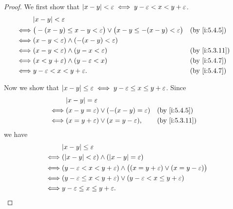 \begin{proof}
  We first show that \(\left\lvert x - y\right\rvert < \varepsilon \iff y - \varepsilon < x < y + \varepsilon\).
  \begin{align*}
         & \abs{x - y} < \varepsilon                                                                                       \\
    \iff & \big(-(x - y) \leq x - y < \varepsilon\big) \lor \big(x - y \leq -(x - y) < \varepsilon\big) &  & \by{i:5.4.5}  \\
    \iff & (x - y < \varepsilon) \land (-(x - y) < \varepsilon)                                                            \\
    \iff & (x - y < \varepsilon) \land (y - x < \varepsilon)                                            &  & \by{i:5.3.11} \\
    \iff & (x < y + \varepsilon) \land (y - \varepsilon < x)                                            &  & \by{i:5.4.7}  \\
    \iff & y - \varepsilon < x < y + \varepsilon.                                                       &  & \by{i:5.4.7}
  \end{align*}

  Now we show that \(\left\lvert x - y\right\rvert \leq \varepsilon \iff y - \varepsilon \leq x \leq y + \varepsilon\).
  Since
  \begin{align*}
         & \abs{x - y} = \varepsilon                                              \\
    \iff & (x - y = \varepsilon) \lor (-(x - y) = \varepsilon) &  & \by{i:5.4.5}  \\
    \iff & (x = y + \varepsilon) \lor (x = y - \varepsilon),   &  & \by{i:5.3.11}
  \end{align*}
  we have
  \begin{align*}
         & \abs{x - y} \leq \varepsilon                                                                             \\
    \iff & (\abs{x - y} < \varepsilon) \land (\abs{x - y} = \varepsilon)                                            \\
    \iff & (y - \varepsilon < x < y + \varepsilon) \land \big((x = y + \varepsilon) \lor (x = y - \varepsilon)\big) \\
    \iff & (y - \varepsilon \leq x < y + \varepsilon) \lor (y - \varepsilon < x \leq y + \varepsilon)               \\
    \iff & y - \varepsilon \leq x \leq y + \varepsilon.
  \end{align*}
\end{proof}

